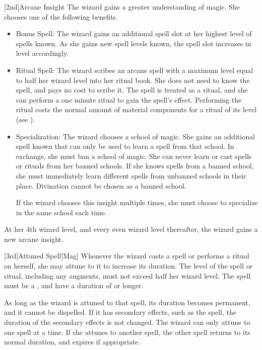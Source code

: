         [2nd]{Arcane Insight}\label{Arcane Insight}
        The wizard gains a greater understanding of magic.
        She chooses one of the following benefits.
        \begin{itemize}
            \item Bonus Spell: The wizard gains an additional spell slot at her highest level of spells known.
                As she gains new spell levels known, the spell slot increases in level accordingly.
            \item Ritual Spell: The wizard scribes an arcane spell with a maximum level equal to half her wizard level into her ritual book.
                She does not need to know the spell, and pays no cost to scribe it.
                The spell is treated as a ritual, and she can perform a one minute ritual to gain the spell's effect.
                Performing the ritual costs the normal amount of material components for a ritual of its level (see ).
            \item Specialization: The wizard chooses a school of magic.
                She gains an additional spell known that can only be used to learn a spell from that school.
                In exchange, she must ban a school of magic.
                She can never learn or cast spells or rituals from her banned schools.
                If she knows spells from a banned school, she must immediately learn different spells from unbanned schools in their place.
                Divination cannot be chosen as a banned school.
                \par If the wizard chooses this insight multiple times, she must choose to specialize in the same school each time.
        \end{itemize}

        At her 4th wizard level, and every even wizard level thereafter, the wizard gains a new arcane insight.

        [3rd]{Attuned Spell}[Mag]
        Whenever the wizard casts a spell or performs a ritual on herself, she may attune to it to increase its duration.
        The level of the spell or ritual, including any augments, must not exceed half her wizard level.
        The spell must be a , and have a duration of \durshort or longer.

        As long as the wizard is attuned to that spell, its duration becomes permanent, and it cannot be dispelled.
        If it has secondary effects, such as the  spell, the duration of the secondary effects is not changed.
        The wizard can only attune to one spell at a time.
        If she attunes to another spell, the other spell returns to its normal duration, and expires if appropriate.

